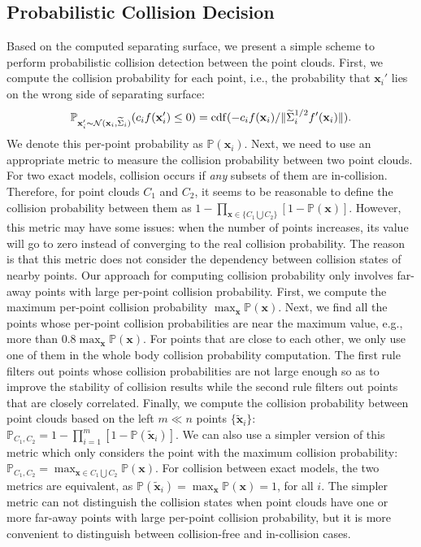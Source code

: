 \subsection{Probabilistic Collision Decision}
\label{sec:7:algorithm:4}

Based on the computed separating surface, we present a simple scheme to perform probabilistic collision detection between the point clouds.
First, we compute the collision probability for each point, i.e., the probability that $\mathbf x_i'$ lies on the wrong side of separating surface:
\begin{equation}
\label{eq:7:perpointcolprob}
\mathbb{P}_{\mathbf x_i' \sim \mathcal{N}(\mathbf x_i, \widetilde{\Sigma}_i)} (c_i f(\mathbf x_i') \leq 0) =
\erf(-c_i f(\mathbf x_i) / \|\widetilde{\Sigma}_i^{1/2} f'(\mathbf x_i)\|).
\end{equation}
We denote this per-point probability as $\mathbb{P}(\mathbf x_i)$.
Next, we need to use an appropriate metric to measure the collision probability between two point clouds.
For two exact models, collision occurs if \emph{any} subsets of them are in-collision. Therefore, for point clouds $C_1$ and $C_2$, it seems to be reasonable to define the collision probability between them as $1 - \prod_{\mathbf x \in \{C_1 \bigcup C_2\}} [1 - \mathbb{P}(\mathbf x)]$. However, this metric may have some issues: when the number of points increases, its value will go to zero instead of converging to the real collision probability. The reason is that this metric does not consider the dependency between collision states of nearby points.
Our approach for computing collision probability only involves far-away points with large per-point collision probability.
First, we compute the maximum per-point collision probability $\max_{\mathbf x} \mathbb{P}(\mathbf x)$. Next, we find all the points whose per-point collision probabilities are near the maximum value, e.g., more than $0.8 \max_{\mathbf x} \mathbb{P}(\mathbf x)$. For points that are close to each other, we only use one of them in the whole body collision probability computation. The first rule filters out points whose collision probabilities are not large enough so as to improve the stability of collision results while the second rule filters out points that are closely correlated. Finally, we compute the collision probability between point clouds based on the left $m \ll n$ points $\{\tilde{\mathbf x}_i\}$: $\mathbb{P}_{C_1, C_2} = 1 - \prod_{i=1}^m [1 - \mathbb{P}(\tilde{\mathbf x}_i)]$. We can also use a simpler version of this metric which only considers the point with the maximum collision probability: $\mathbb{P}_{C_1, C_2} = \max_{\mathbf x \in C_1 \bigcup C_2} \mathbb{P}(\mathbf x)$. For collision between exact models, the two metrics are equivalent, as $\mathbb{P}(\tilde{\mathbf x}_i) = \max_{\mathbf x} \mathbb{P}(\mathbf x) = 1$,
for all $i$. The simpler metric can not distinguish the collision states when point clouds have one or more
far-away points with large per-point collision probability, but it is more convenient to distinguish between collision-free and in-collision cases.


